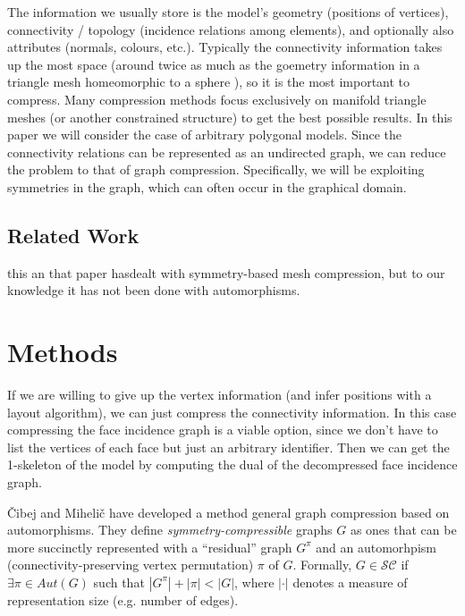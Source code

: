 \documentclass{egpubl}
\begin{document}
The information we usually store is the model's geometry (positions of vertices), connectivity / topology (incidence relations among elements), and optionally also attributes (normals, colours, etc.).
Typically the connectivity information takes up the most space (around twice as much as the goemetry information in a triangle mesh homeomorphic to a sphere \cite{rossignac1999edgebreaker}), so it is the most important to compress.
Many compression methods focus exclusively on manifold triangle meshes (or another constrained structure) to get the best possible results.  
In this paper we will consider the case of arbitrary polygonal models. Since the connectivity relations can be represented as an undirected graph, we can reduce the problem to that of graph compression.
Specifically, we will be exploiting symmetries in the graph, which can often occur in the graphical domain.

\subsection{Related Work}


this an that paper hasdealt with symmetry-based mesh compression, but to our knowledge it has not been done with automorphisms.

\section{Methods}

If we are willing to give up the vertex information (and infer positions with a layout algorithm), we can just compress the connectivity information. In this case compressing the face incidence graph is a viable option, since we don't have to list the vertices of each face but just an arbitrary identifier. Then we can get the 1-skeleton of the model by computing the dual of the decompressed face incidence graph.

Čibej and Mihelič \cite{cibej2021automorphisms} have developed a method general graph compression based on automorphisms. They define
\textit{symmetry-compressible} graphs $G$
as ones that can be more succinctly represented with a ``residual'' graph $G^\pi$ and an automorhpism (connectivity-preserving vertex permutation) $\pi$ of $G$.
Formally, $G \in \mathcal{S}\mathcal{C}$ if $\exists \pi \in Aut(G)$ such that $|G^\pi| + |\pi| < |G|$, where $|\cdot|$ denotes a measure of representation size (e.g. number of edges). 
\end{document}
